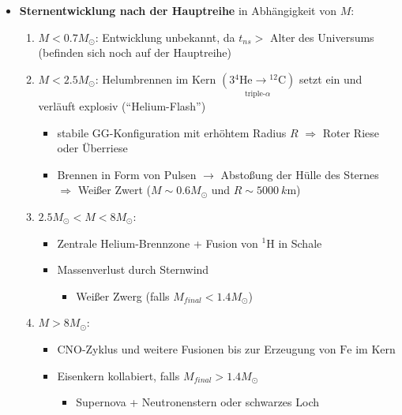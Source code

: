 \begin{itemize}
\begin{itemize}
				Stern mit $M\approx 100 M_\odot: $ $t_\odot\propto \underset{\underset{\text{astronomischer Zeitskala}}{\text{kurz auf}}}{\num{1}-\SI{3}{M\year}}$
		\end{itemize}
	\item \textbf{Sternentwicklung nach der Hauptreihe} in Abhängigkeit von $M$:
		\begin{enumerate}[label={(\roman*)}]
			\item $M<\num{0.7}M_\odot$: Entwicklung unbekannt, da $t_{ns}>$ Alter des Universums (befinden sich noch auf der Hauptreihe)
			\item $M<\num{2.5}M_\odot$: Helumbrennen im Kern $\underset{\text{triple-$\alpha$}}{(3{}^4\text{He}\to{}^{12}\text{C})}$ setzt ein und verläuft explosiv ("`Helium-Flash"')
				\begin{itemize}
					\item stabile GG-Konfiguration mit erhöhtem Radius $R$ $\Rightarrow $ Roter Riese oder Überriese
						\begin{figure}[H]
							\centering
						\end{figure}
					\item[] Brennen in Form von Pulsen $\to$ Abstoßung der Hülle des Sternes $\Rightarrow$ Weißer Zwert ($M\sim \num{0.6}M_\odot$ und $R\sim\SI{5000}{k\m}$)
				\end{itemize}
			\item $\num{2.5}M_\odot < M < \num{8}M_\odot$:
				\begin{itemize}[label={$\cdot$}]
					\item Zentrale Helium-Brennzone + Fusion von ${}^1\text{H}$ in Schale
					\item Massenverlust durch Sternwind
						\begin{itemize}
							\item[$\Rightarrow$] Weißer Zwerg (falls $M_{final}<\num{1.4}M_\odot$)
						\end{itemize}
				\end{itemize}
			\item $M>8M_\odot$:
				\begin{itemize}[label={$\cdot$}]
					\item CNO-Zyklus und weitere Fusionen bis zur Erzeugung von $\text{Fe}$ im Kern
					\item Eisenkern kollabiert, falls $M_{final}>\num{1.4}M_\odot$
						\begin{itemize}
							\item[$\Rightarrow$] Supernova + Neutronenstern oder schwarzes Loch
						\end{itemize}
				\end{itemize}
		\end{enumerate}
\end{itemize}
